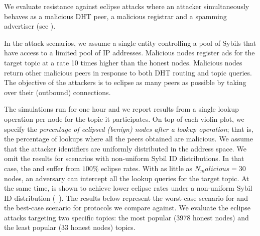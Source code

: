 

We evaluate \sysname resistance against eclipse attacks where an attacker simultaneously behaves as a malicious DHT peer, a malicious registrar and a spamming advertiser (see ). 

In the attack scenarios, we assume a single entity controlling a pool of Sybils that have access to a limited pool of IP addresses. Malicious nodes register ads for the target topic at a rate 10 times higher than the honest nodes. Malicious nodes return other malicious peers in response to both DHT routing and topic queries. The objective of the attackers is to eclipse as many peers as possible by taking over their (outbound) connections.

The simulations run for one hour and we report results from a single lookup operation per node for the topic it participates. On top of each violin plot, we specify the \emph{percentage of eclipsed (benign) nodes after a lookup operation}; that is, the percentage of lookups where all the peers obtained are malicious. We assume that the attacker identifiers are uniformly distributed in the address space. We omit the results for scenarios with non-uniform Sybil ID distributions. In that case, the \altname and \altnameticket suffer from $100\%$ eclipse rates. With as little as $N_malicious = 30$ nodes, an adversary can intercept all the lookup queries for the target topic. At the same time, \sysname is shown to achieve lower eclipse rates under a non-uniform Sybil ID distribution (~). The results below represent the worst-case scenario for \sysname and the best-case scenario for protocols we compare against. 
We evaluate the eclipse attacks targeting two specific topics: the most popular (3978 honest nodes) and the least popular (33 honest nodes) topics.


